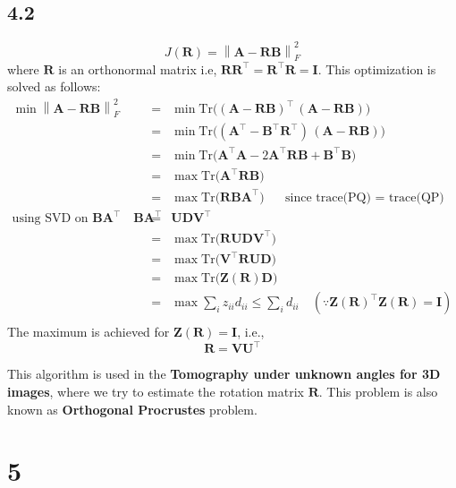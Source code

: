 \documentclass[12pt]{article}
\newcommand{\norm}[1]{\left\lVert #1 \right\rVert}
\begin{document}
\subsection*{4.2}
$$J(\boldsymbol{R}) = \norm{\boldsymbol{A} - \boldsymbol{RB}}_F^2$$
where $\boldsymbol{R}$ is an orthonormal matrix i.e, $\boldsymbol{R}\boldsymbol{R}^\intercal = \boldsymbol{R}^\intercal \boldsymbol{R} = \boldsymbol{I}$.
This optimization is solved as follows:
\begin{eqnarray*}
	\min \norm{\boldsymbol{A} - \boldsymbol{RB}}_F^2 &=& \min \mathrm{Tr}\bigg((\boldsymbol{A}-\boldsymbol{RB})^\intercal\, (\boldsymbol{A}-\boldsymbol{RB})\bigg)\\
	&=& \min \mathrm{Tr}\bigg((\boldsymbol{A}^\intercal-\boldsymbol{B}^\intercal\boldsymbol{R}^\intercal)\, (\boldsymbol{A}-\boldsymbol{RB})\bigg)\\
	&=& \min \mathrm{Tr}\bigg(\boldsymbol{A}^\intercal\boldsymbol{A}-2\boldsymbol{A}^\intercal\boldsymbol{RB} + \boldsymbol{B}^\intercal\boldsymbol{B}\bigg)\\
	&=& \max \mathrm{Tr}\bigg(\boldsymbol{A}^\intercal\boldsymbol{RB}\bigg)\\
	&=& \max \mathrm{Tr}\bigg(\boldsymbol{RB}\boldsymbol{A}^\intercal\bigg) \:\:\:\quad \text{since trace(PQ) = trace(QP)}\\
\text{using SVD on $\boldsymbol{BA}^\intercal$}\quad \boldsymbol{BA}^\intercal &=& \boldsymbol{UDV}^\intercal\\
&=& \max  \mathrm{Tr}\bigg(\boldsymbol{R}\boldsymbol{UDV}^\intercal\bigg)\\
&=& \max \mathrm{Tr}\bigg(\boldsymbol{V}^\intercal\boldsymbol{RUD}\bigg)\\
&=& \max \mathrm{Tr}\bigg(\boldsymbol{Z(R)}\boldsymbol{D}\bigg)\\
&=& \max \sum \limits_{i} z_{ii}d_{ii} \leq \sum \limits_{i} d_{ii} \quad (\because \boldsymbol{Z(R)}^\intercal \boldsymbol{Z(R)} = \boldsymbol{I})\\
\end{eqnarray*}
The maximum is achieved for $\boldsymbol{Z(R)} = \boldsymbol{I}$, i.e.,
$$\boldsymbol{R} = \boldsymbol{V} \boldsymbol{U}^\intercal$$

This algorithm is used in the \textbf{Tomography under unknown angles for 3D images}, where we try to estimate the rotation matrix $\boldsymbol{R}$. This problem is also known as \textbf{Orthogonal Procrustes} problem.
\section*{5}
\end{document}

